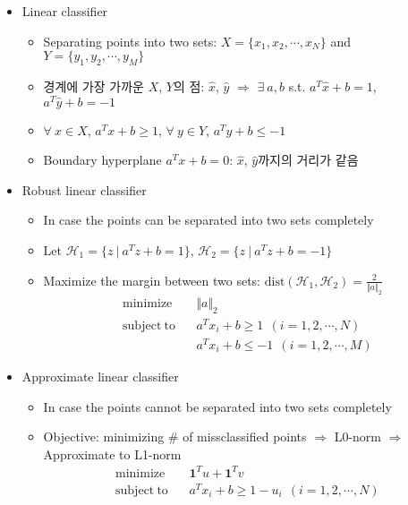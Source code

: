 \begin{itemize}
    \item Linear classifier
    \begin{itemize}
        \item Separating points into two sets: $X=\{x_1,x_2,\cdots,x_N\}$ and $Y=\{y_1,y_2,\cdots,y_M\}$
        \item 경계에 가장 가까운 $X$, $Y$의 점: $\hat{x}$, $\hat{y}$ $\Rightarrow$ $\exists~a,b$ s.t. $a^T\hat{x}+b=1$, $a^T\hat{y}+b=-1$
        \item $\forall~x\in X$, $a^Tx+b\geq1$, $\forall~y\in Y$, $a^Ty+b\leq-1$
        \item Boundary hyperplane $a^Tx+b=0$: $\hat{x}$, $\hat{y}$까지의 거리가 같음
    \end{itemize}
    \newpage
    \item Robust linear classifier
    \begin{itemize}
        \item In case the points can be separated into two sets completely
        \item Let $\mathcal{H}_1=\{z~|~a^Tz+b=1\}$, $\mathcal{H}_2=\{z~|~a^Tz+b=-1\}$
        \item Maximize the margin between two sets: $\mathrm{dist}(\mathcal{H}_1,\mathcal{H}_2)=\frac{2}{\Vert a\Vert_2}$
        \begin{equation}\begin{aligned}
            \mathrm{minimize}~~&~~\Vert a\Vert_2 \\
            \mathrm{subject~to}~~&~~a^Tx_i+b\geq1~~(i=1,2,\cdots,N) \\
                &~~a^Tx_i+b\leq-1~~(i=1,2,\cdots,M)
        \end{aligned}\end{equation}
    \end{itemize}
    \item Approximate linear classifier
    \begin{itemize}
        \item In case the points cannot be separated into two sets completely
        \item Objective: minimizing \# of missclassified points $\Rightarrow$ L0-norm $\Rightarrow$ Approximate to L1-norm
        \begin{equation}\begin{aligned}
            \mathrm{minimize}~~&~~\mathbf{1}^Tu+\mathbf{1}^Tv \\
            \mathrm{subject~to}~~&~~a^Tx_i+b\geq1-u_i~~(i=1,2,\cdots,N) \\

\end{aligned}
\end{equation}
\end{itemize}
\end{itemize}
